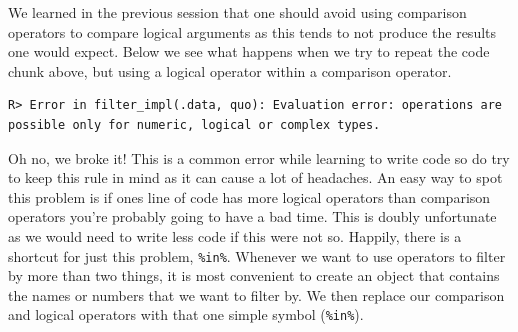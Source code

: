 \documentclass[]{book}
\newenvironment{Shaded}{\begin{snugshade}}{\end{snugshade}}
\newcommand{\KeywordTok}[1]{\textcolor[rgb]{0.13,0.29,0.53}{\textbf{#1}}}
\newcommand{\DataTypeTok}[1]{\textcolor[rgb]{0.13,0.29,0.53}{#1}}
\newcommand{\StringTok}[1]{\textcolor[rgb]{0.31,0.60,0.02}{#1}}
\newcommand{\CommentTok}[1]{\textcolor[rgb]{0.56,0.35,0.01}{\textit{#1}}}
\newcommand{\OtherTok}[1]{\textcolor[rgb]{0.56,0.35,0.01}{#1}}
\newcommand{\OperatorTok}[1]{\textcolor[rgb]{0.81,0.36,0.00}{\textbf{#1}}}
\newcommand{\NormalTok}[1]{#1}
\theoremstyle{definition}
\theoremstyle{definition}
\theoremstyle{definition}
\theoremstyle{remark}
\begin{document}
We learned in the previous session that one should avoid using
comparison operators to compare logical arguments as this tends to not
produce the results one would expect. Below we see what happens when we
try to repeat the code chunk above, but using a logical operator within
a comparison operator.

\begin{Shaded}
\end{Shaded}

\begin{verbatim}
R> Error in filter_impl(.data, quo): Evaluation error: operations are possible only for numeric, logical or complex types.
\end{verbatim}

Oh no, we broke it! This is a common error while learning to write code
so do try to keep this rule in mind as it can cause a lot of headaches.
An easy way to spot this problem is if ones line of code has more
logical operators than comparison operators you're probably going to
have a bad time. This is doubly unfortunate as we would need to write
less code if this were not so. Happily, there is a shortcut for just
this problem, \texttt{\%in\%}. Whenever we want to use operators to
filter by more than two things, it is most convenient to create an
object that contains the names or numbers that we want to filter by. We
then replace our comparison and logical operators with that one simple
symbol (\texttt{\%in\%}).
\end{document}
